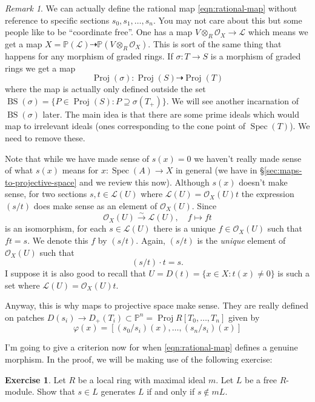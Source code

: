 \documentclass[12pt]{article}
\numberwithin{equation}{section}
\theoremstyle{definition}
\newtheorem{exercise}[theorem]{Exercise}
\theoremstyle{remark}
\newtheorem{remark}[theorem]{Remark}
\newcommand{\Ocal}{\mathcal{O}}
\newcommand{\PP}{\mathbb{P}}
\newcommand{\Spec}{\operatorname{Spec}}
\newcommand{\Proj}{\operatorname{Proj}}
\newcommand{\Lcal}{\mathcal{L}}
\newcommand{\BS}{\operatorname{BS}}
\begin{document}
\begin{remark}
	We can actually define the rational map \eqref{eqn:rational-map} without reference to specific sections $s_0,s_1,\ldots, s_n$. 
	You may not care about this but some people like to be ``coordinate free''. 
	One has a map $V\otimes_R \Ocal_X \to \Lcal$ which means we get a map $X=\PP(\Lcal) \dashrightarrow \PP(V\otimes_R \Ocal_X)$.
	This is sort of the same thing that happens for any morphism of graded rings.
	If $\sigma:T\to S$ is a morphism of graded rings we get a map 
	$$ \Proj(\sigma): \Proj(S) \dashrightarrow \Proj(T) $$
	where the map is actually only defined outside the set $\BS(\sigma) = \lbrace P \in \Proj(S) : P\supseteq \sigma(T_+) \rbrace$.
	We will see another incarnation of $\BS(\sigma)$ later. 
	The main idea is that there are some prime ideals which would map to irrelevant ideals (ones corresponding to the cone point of $\Spec(T)$).
	We need to remove these.
 
\end{remark}	
	
Note that while we have made sense of $s(x)=0$ we haven't really made sense of what $s(x)$ means for $x:\Spec(A)\to X$ in general (we have in \S\ref{sec:maps-to-projective-space} and we review this now).
Although $s(x)$ doesn't make sense, for two sections $s,t \in \Lcal(U)$ where $\Lcal(U) = \Ocal_X(U) t$ the expression $(s/t)$ does make sense as an element of $\Ocal_X(U)$. 
Since 
$$\Ocal_X(U) \xrightarrow{\sim} \Lcal(U), \quad f \mapsto f t $$
is an isomorphism, for each $s\in \Lcal(U)$ there is a unique $f\in \Ocal_X(U)$ such that $ft=s$.
We denote this $f$ by $(s/t)$. 
Again, $(s/t)$ is the \emph{unique} element of $\Ocal_X(U)$ such that 
 $$ (s/t) \cdot t = s. $$
I suppose it is also good to recall that $U = D(t) = \lbrace x \in X \colon t(x) \neq 0 \rbrace$ is such a set where $\Lcal(U) = \Ocal_X(U)t$.

Anyway, this is why maps to projective space make sense. 
They are really defined on patches $D(s_i) \to D_+(T_i) \subset \PP^n = \Proj R[T_0,\ldots,T_n]$ given by 
 $$ \varphi(x) = [(s_0/s_i)(x),\ldots,(s_n/s_i)(x)] $$


I'm going to give a criterion now for when \eqref{eqn:rational-map} defines a genuine morphism.
In the proof, we will be making use of the following exercise:
\begin{exercise}
	Let $R$ be a local ring with maximal ideal $m$. Let $L$ be a free $R$-module. 
	Show that $s \in L$ generates $L$ if and only if $s \notin m L$. 
\end{exercise}
\end{document}
